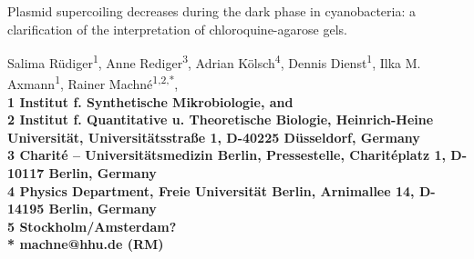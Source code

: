 \documentclass[10pt,a4]{article}
\begin{document}


\begin{flushleft}
{\Large Plasmid supercoiling decreases during the dark phase in
  cyanobacteria: a clarification of the interpretation of
  chloroquine-agarose gels.}

Salima R\"udiger\textsuperscript{1}, 
Anne Rediger\textsuperscript{3},
Adrian K\"olsch\textsuperscript{4},
Dennis Dienst\textsuperscript{1},
Ilka M. Axmann\textsuperscript{1},
Rainer Machn\'e\textsuperscript{1,2,*},
\\
\bigskip
\bf{1} Institut f. Synthetische Mikrobiologie, and\\
\bf{2} Institut f. Quantitative u. Theoretische Biologie, Heinrich-Heine Universit\"at, Universit\"atsstra\ss{}e 1, D-40225 D\"usseldorf, Germany
\\
\bf{3} Charit\'e -- Universit\"atsmedizin Berlin, Pressestelle, Charit\'eplatz 1, D-10117 Berlin, Germany
\\
\bf{4} Physics Department, Freie Universität Berlin, Arnimallee 14, D-14195 Berlin, Germany
\\
\bf{5} Stockholm/Amsterdam?
\\
\bigskip
* machne@hhu.de (RM)

\end{flushleft}
\end{document}
